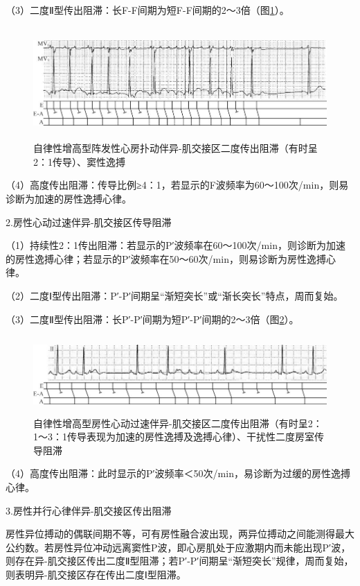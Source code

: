 （3）二度Ⅱ型传出阻滞：长F-F间期为短F-F间期的2～3倍（图\ref{fig23-2}）。

\begin{figure}[!htbp]
 \centering
 \includegraphics[width=5.80208in,height=1.67708in]{./images/Image00386.jpg}
 \captionsetup{justification=centering}
 \caption{自律性增高型阵发性心房扑动伴异-肌交接区二度传出阻滞（有时呈2：1传导）、窦性逸搏}
 \label{fig23-2}
  \end{figure} 

（4）高度传出阻滞：传导比例≥4：1，若显示的F波频率为60～100次/min，则易诊断为加速的房性逸搏心律。

2.房性心动过速伴异-肌交接区传导阻滞

（1）持续性2：1传出阻滞：若显示的P′波频率在60～100次/min，则诊断为加速的房性逸搏心律；若显示的P′波频率在50～60次/min，则易诊断为房性逸搏心律。

（2）二度Ⅰ型传出阻滞：P′-P′间期呈“渐短突长”或“渐长突长”特点，周而复始。

（3）二度Ⅱ型传出阻滞：长P′-P′间期为短P′-P′间期的2～3倍（图\ref{fig23-3}）。

\begin{figure}[!htbp]
 \centering
 \includegraphics[width=5.80208in,height=1.16667in]{./images/Image00387.jpg}
 \captionsetup{justification=centering}
 \caption{自律性增高型房性心动过速伴异-肌交接区二度传出阻滞（有时呈2：1～3：1传导表现为加速的房性逸搏及逸搏心律）、干扰性二度房室传导阻滞}
 \label{fig23-3}
  \end{figure} 

（4）高度传出阻滞：此时显示的P′波频率＜50次/min，易诊断为过缓的房性逸搏心律。

3.房性并行心律伴异-肌交接区传出阻滞

房性异位搏动的偶联间期不等，可有房性融合波出现，两异位搏动之间能测得最大公约数。若房性异位冲动远离窦性P波，即心房肌处于应激期内而未能出现P′波，则存在异-肌交接区传出二度Ⅱ型阻滞；若P′-P′间期呈“渐短突长”规律，周而复始，则表明异-肌交接区存在传出二度Ⅰ型阻滞。

